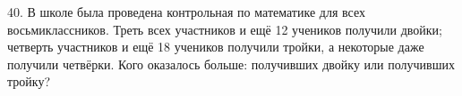 40. В школе была проведена контрольная по математике для всех восьмиклассников. Треть всех участников и ещё 12 учеников получили двойки; четверть участников и ещё 18 учеников получили тройки, а некоторые даже получили четвёрки. Кого оказалось больше: получивших двойку или получивших тройку?\\
